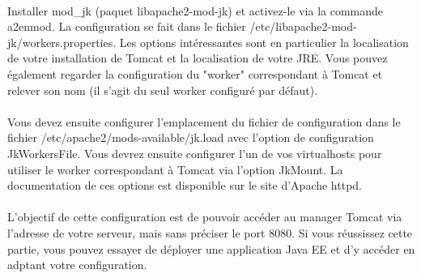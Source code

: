 \documentclass[12pt,a4paper]{article}
\begin{document}
\paragraph{}
Installer mod\_jk (paquet libapache2-mod-jk) et activez-le via la commande a2enmod. La configuration se fait dans le fichier /etc/libapache2-mod-jk/workers.properties. Les options intéressantes sont en particulier la localisation de votre installation de Tomcat et la localisation de votre JRE. Vous pouvez également regarder la configuration du "worker" correspondant à Tomcat et relever son nom (il s'agit du seul worker configuré par défaut).

\paragraph{}
Vous devez ensuite configurer l'emplacement du fichier de configuration dans le fichier /etc/apache2/mods-available/jk.load avec l'option de configuration JkWorkersFile. Vous devrez ensuite configurer l'un de vos virtualhosts pour utiliser le worker correspondant à Tomcat via l'option JkMount. La documentation de ces options est disponible sur le site d'Apache httpd.

\paragraph{}
L'objectif de cette configuration est de pouvoir accéder au manager Tomcat via l'adresse de votre serveur, mais sans préciser le port 8080. Si vous réussissez cette partie, vous pouvez essayer de déployer une application Java EE et d'y accéder en adptant votre configuration.
\end{document}
